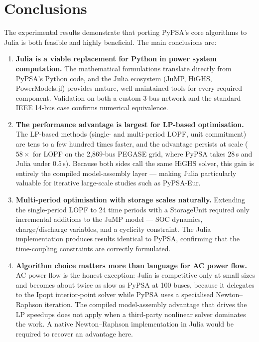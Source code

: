 \section{Conclusions}

The experimental results demonstrate that porting PyPSA's core algorithms to Julia is both feasible and highly beneficial. The main conclusions are:

\begin{enumerate}
    \item \textbf{Julia is a viable replacement for Python in power system computation.}
    The mathematical formulations translate directly from PyPSA's Python code, and the Julia ecosystem (JuMP, HiGHS, PowerModels.jl) provides mature, well-maintained tools for every required component. Validation on both a custom 3-bus network and the standard IEEE 14-bus case confirms numerical equivalence.

    \item \textbf{The performance advantage is largest for LP-based optimisation.}
    The LP-based methods (single- and multi-period LOPF, unit commitment) are tens to a few hundred times faster, and the advantage persists at scale ($58\times$ for LOPF on the 2{,}869-bus PEGASE grid, where PyPSA takes $28$\,s and Julia under $0.5$\,s). Because both sides call the same HiGHS solver, this gain is entirely the compiled model-assembly layer --- making Julia particularly valuable for iterative large-scale studies such as PyPSA-Eur.

    \item \textbf{Multi-period optimisation with storage scales naturally.}
    Extending the single-period LOPF to 24 time periods with a StorageUnit required only incremental additions to the JuMP model --- SOC dynamics, charge/discharge variables, and a cyclicity constraint. The Julia implementation produces results identical to PyPSA, confirming that the time-coupling constraints are correctly formulated.

    \item \textbf{Algorithm choice matters more than language for AC power flow.}
    AC power flow is the honest exception: Julia is competitive only at small sizes and becomes about twice as slow as PyPSA at 100 buses, because it delegates to the Ipopt interior-point solver while PyPSA uses a specialised Newton--Raphson iteration. The compiled model-assembly advantage that drives the LP speedups does not apply when a third-party nonlinear solver dominates the work. A native Newton--Raphson implementation in Julia would be required to recover an advantage here.


\end{enumerate}
